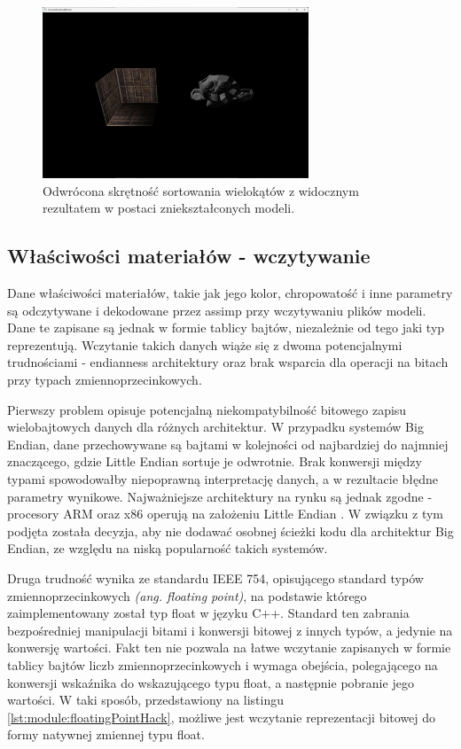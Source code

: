 \begin{figure}[h!]
	\centering
	\includegraphics[width=300px]{images/impl/3_inverted_handiness.png}
	\caption{Odwrócona skrętność sortowania wielokątów z widocznym rezultatem w postaci zniekształconych modeli.}
	\label{Impl_InvertedHandiness}
\end{figure}


\subsection{Właściwości materiałów - wczytywanie}
Dane właściwości materiałów, takie jak jego kolor, chropowatość i inne parametry są odczytywane i dekodowane przez assimp przy wczytywaniu plików modeli. Dane te zapisane są jednak w formie tablicy bajtów, niezależnie od tego jaki typ reprezentują. Wczytanie takich danych wiąże się z dwoma potencjalnymi trudnościami - endianness architektury oraz brak wsparcia dla operacji na bitach przy typach zmiennoprzecinkowych.

Pierwszy problem opisuje potencjalną niekompatybilność bitowego zapisu wielobajtowych danych dla różnych architektur. W przypadku systemów Big Endian, dane przechowywane są bajtami w kolejności od najbardziej do najmniej znaczącego, gdzie Little Endian sortuje je odwrotnie. Brak konwersji między typami spowodowałby niepoprawną interpretację danych, a w rezultacie błędne parametry wynikowe. Najważniejsze architektury na rynku są jednak zgodne - procesory ARM oraz x86 operują na założeniu Little Endian \cite{ARM:Developer:Endianness} \cite{Oracle:HelpCenter:x86ByteOrdering}. W związku z tym podjęta została decyzja, aby nie dodawać osobnej ścieżki kodu dla architektur Big Endian, ze względu na niską popularność takich systemów.

Druga trudność wynika ze standardu IEEE 754, opisującego standard typów zmiennoprzecinkowych \textit{(ang. floating point)}, na podstawie którego zaimplementowany został typ float w języku C++. Standard ten zabrania bezpośredniej manipulacji bitami i konwersji bitowej z innych typów, a jedynie na konwersję wartości. Fakt ten nie pozwala na łatwe wczytanie zapisanych w formie tablicy bajtów liczb zmiennoprzecinkowych i wymaga obejścia, polegającego na konwersji wskaźnika do wskazującego typu float, a następnie pobranie jego wartości.  W taki sposób, przedstawiony na listingu \ref{lst:module:floatingPointHack}, możliwe jest wczytanie reprezentacji bitowej do formy natywnej zmiennej typu float.

